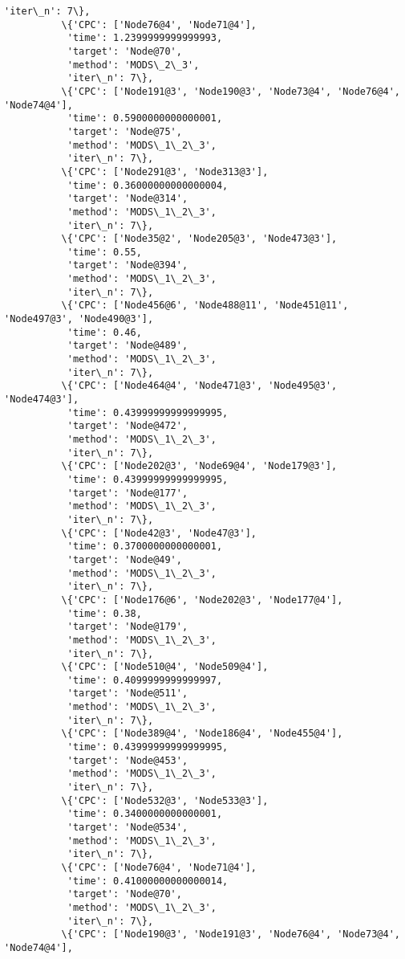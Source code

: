 \documentclass[11pt]{article}
\begin{document}
\begin{Verbatim}[commandchars=\\\{\}]
           'iter\_n': 7\},
          \{'CPC': ['Node76@4', 'Node71@4'],
           'time': 1.2399999999999993,
           'target': 'Node@70',
           'method': 'MODS\_2\_3',
           'iter\_n': 7\},
          \{'CPC': ['Node191@3', 'Node190@3', 'Node73@4', 'Node76@4', 'Node74@4'],
           'time': 0.5900000000000001,
           'target': 'Node@75',
           'method': 'MODS\_1\_2\_3',
           'iter\_n': 7\},
          \{'CPC': ['Node291@3', 'Node313@3'],
           'time': 0.36000000000000004,
           'target': 'Node@314',
           'method': 'MODS\_1\_2\_3',
           'iter\_n': 7\},
          \{'CPC': ['Node35@2', 'Node205@3', 'Node473@3'],
           'time': 0.55,
           'target': 'Node@394',
           'method': 'MODS\_1\_2\_3',
           'iter\_n': 7\},
          \{'CPC': ['Node456@6', 'Node488@11', 'Node451@11', 'Node497@3', 'Node490@3'],
           'time': 0.46,
           'target': 'Node@489',
           'method': 'MODS\_1\_2\_3',
           'iter\_n': 7\},
          \{'CPC': ['Node464@4', 'Node471@3', 'Node495@3', 'Node474@3'],
           'time': 0.43999999999999995,
           'target': 'Node@472',
           'method': 'MODS\_1\_2\_3',
           'iter\_n': 7\},
          \{'CPC': ['Node202@3', 'Node69@4', 'Node179@3'],
           'time': 0.43999999999999995,
           'target': 'Node@177',
           'method': 'MODS\_1\_2\_3',
           'iter\_n': 7\},
          \{'CPC': ['Node42@3', 'Node47@3'],
           'time': 0.3700000000000001,
           'target': 'Node@49',
           'method': 'MODS\_1\_2\_3',
           'iter\_n': 7\},
          \{'CPC': ['Node176@6', 'Node202@3', 'Node177@4'],
           'time': 0.38,
           'target': 'Node@179',
           'method': 'MODS\_1\_2\_3',
           'iter\_n': 7\},
          \{'CPC': ['Node510@4', 'Node509@4'],
           'time': 0.4099999999999997,
           'target': 'Node@511',
           'method': 'MODS\_1\_2\_3',
           'iter\_n': 7\},
          \{'CPC': ['Node389@4', 'Node186@4', 'Node455@4'],
           'time': 0.43999999999999995,
           'target': 'Node@453',
           'method': 'MODS\_1\_2\_3',
           'iter\_n': 7\},
          \{'CPC': ['Node532@3', 'Node533@3'],
           'time': 0.3400000000000001,
           'target': 'Node@534',
           'method': 'MODS\_1\_2\_3',
           'iter\_n': 7\},
          \{'CPC': ['Node76@4', 'Node71@4'],
           'time': 0.41000000000000014,
           'target': 'Node@70',
           'method': 'MODS\_1\_2\_3',
           'iter\_n': 7\},
          \{'CPC': ['Node190@3', 'Node191@3', 'Node76@4', 'Node73@4', 'Node74@4'],

\end{Verbatim}
\end{document}
